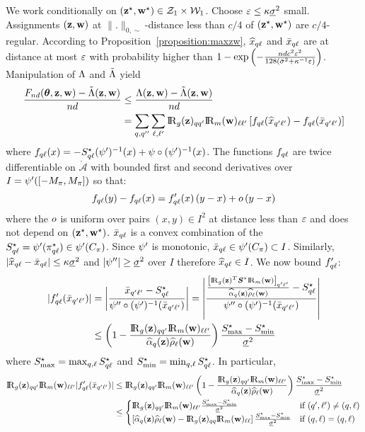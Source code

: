\proofbegin
We work conditionally on $(\mathbf{z}^\star, \mathbf{w}^\star) \in \mathcal{Z}_1 \times \mathcal{W}_1$. Choose $\varepsilon \leq \kappa \underline{\sigma}^2$ small. Assignments $(\mathbf{z}, \mathbf{w})$ at $\|.\|_{0,\sim}$-distance less than $c/4$ of $(\mathbf{z}^\star, \mathbf{w}^\star)$ are $c/4$-regular. According to Proposition~\ref{proposition:maxzw}, $\widehat{x}_{q\ell}$ and $\bar{x}_{q\ell}$ are at distance at most $\varepsilon$ with probability higher than $1 - \exp \left( - \frac{nd c^2 \varepsilon^2}{128(\bar{\sigma}^2 + \kappa^{-1} \varepsilon)}\right)$. Manipulation of $\Lambda$ and $\tilde{\Lambda}$ yield
\begin{align*}
  \frac{\Fnd(\btheta, \bz, \bw) - \Lambtilde(\bz, \bw)}{\n\dd} & \leq \frac{\Lamb(\bz, \bw) - \Lambtilde(\bz, \bw)}{\n\dd} \\
  & = \sum_{\kk, \kp'} \sum_{\el, \lp} \Rgbz_{\kk\kp} \Rmbw_{\el\lp} \left[ f_{\kk\el}(\hx_{\kp\lp}) - f_{\kk\el}(\barx_{\kp\lp}) \right]
\end{align*}
where $f_{q\ell}(x) = - S^\star_{q\ell} (\psi')^{-1}(x) + \psi\circ(\psi')^{-1}(x)$. The functions $f_{q\ell}$ are twice differentiable on $\mathring{\mathcal{A}}$ with bounded first and second derivatives over $I = \psi'([-M_{\pi}, M_{\pi}])$ so that:
\begin{equation*}
  f_{\kk\el}(y) - f_{\kk\el}(x) = f'_{\kk\el}(x) \left( y - x \right) + \smallO\left( y - x \right)
\end{equation*}
where the $o$ is uniform over pairs $(x,y) \in I^2$ at distance less than $\varepsilon$ and does not depend on $(\mathbf{z}^\star, \mathbf{w}^\star)$. $\bar{x}_{q\ell}$ is a convex combination of the $S^\star_{q\ell} = \psi'(\pi^\star_{q\ell}) \in \psi'(C_{\pi})$. Since $\psi'$ is monotonic, $\bar{x}_{q\ell} \in \psi'(C_\pi) \subset I$. Similarly, $| \widehat{x}_{q\ell} - \bar{x}_{q\ell} | \leq \kappa \underline{\sigma}^2$ and $|\psi''| \geq \underline{\sigma}^2$ over $I$ therefore $\widehat{x}_{q\ell} \in I$. We now bound $f'_{q\ell}$:
\begin{align*}
  | f'_{\kk\el}(\barx_{\kp\lp}) | &= \left| \frac{\barx_{\kp\lp} - \Salkl}{\normp' \circ \normpm (\barx_{\kp\lp})} \right|  = \left| \frac{\frac{\left[ \Rgbz\transpose \Sal \Rmbw \right]_{\kp\lp}}{\pizk\rhowl} - \Salkl}{\normp' \circ \normpm (\barx_{\kp\lp})} \right| \\
  & \leq \left( 1 - \frac{\Rgbz_{\kk\kp}\Rmbw_{\el\lp}}{\pizk\rhowl}\right) \frac{\Salmax - \Salmin}{\vmin^2}
\end{align*}
where $S^\star_{\max} = \max_{q,\ell} S^\star_{q\ell}$ and $S^\star_{\min} = \min_{q,\ell} S^\star_{q\ell}$. In particular,
\begin{align*}
  \Rgbz_{\kk\kp}\Rmbw_{\el\lp} | f'_{\kk\el}(\barx_{\kp\lp}) | & \leq \Rgbz_{\kk\kp}\Rmbw_{\el\lp} \left( 1 - \frac{\Rgbz_{\kk\kp}\Rmbw_{\el\lp}}{\pizk\rhowl}\right) \frac{\Salmax - \Salmin}{\vmin^2}  \\
  & \leq
  \begin{cases}
    \Rgbz_{\kk\kp}\Rmbw_{\el\lp} \frac{\Salmax - \Salmin}{\vmin^2} & \text{if } (\kp, \lp) \neq (\kk, \el) \\
    \left[ \pizk \rhowl - \Rgbz_{\kk\kk}\Rmbw_{\el\el} \right]  \frac{\Salmax - \Salmin}{\vmin^2} & \text{if } (\kk, \el) = (\kk, \el)
  \end{cases}
\end{align*}

